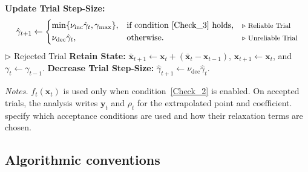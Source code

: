 \documentclass{article}
\begin{document}
\begin{algorithm}[t]
\begin{algorithmic}[1]
            \State \textbf{Update Trial Step-Size:} \[
            \hat\gamma_{t+1}
            \gets
            \left\{\begin{array}{@{}lll@{}}
            \min\{\nu_{\mathrm{inc}}\hat\gamma_t,\gamma_{\max}\},
            &\textnormal{if condition~\eqref{Check_3} holds},
            &\text{\footnotesize $\triangleright$ Reliable Trial}\\[1mm]
            \nu_{\mathrm{dec}}\hat\gamma_t,
            &\textnormal{otherwise}.
            &\text{\footnotesize $\triangleright$ Unreliable Trial}
            \end{array}\right.
            \]
        \Else
        \hfill {\footnotesize $\triangleright$ Rejected Trial}
            \State \textbf{Retain State:}
            \(\bar {\bm{x}}_{t+1}\gets \bm{x}_t+(\bar {\bm{x}}_t-\bm{x}_{t-1})\),
            \(\bm{x}_{t+1}\gets \bm{x}_t\), and
            \(\gamma_t\gets\gamma_{t-1}\).
            \State \textbf{Decrease Trial Step-Size:}
            \(\hat\gamma_{t+1}\gets\nu_{\mathrm{dec}}\hat\gamma_t\).
        \EndIf
    \EndFor
\end{algorithmic}
\noindent\textit{Notes.}  \(f_t(\bm{x}_t)\) is used only when condition~\eqref{Check_2} is enabled.
On accepted trials, the analysis writes $\bm{y}_t$ and $\rho_t$ for the extrapolated point and coefficient. 
 specify which acceptance conditions are used and how their relaxation terms are chosen.
\end{algorithm}

\subsection{Algorithmic conventions}
\label{Notation_2.1}
\end{document}
